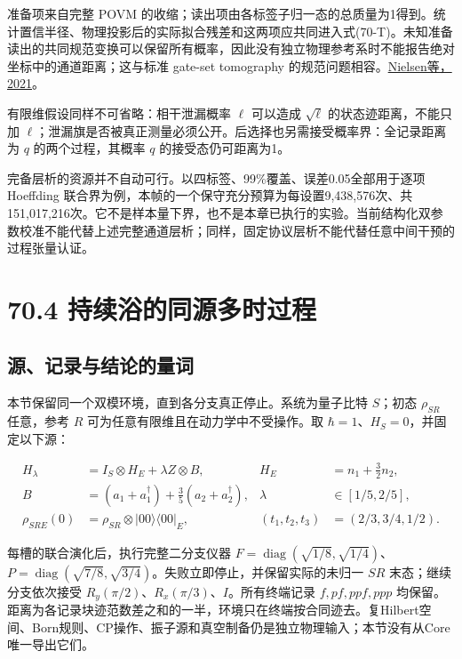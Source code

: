 \documentclass[
  11pt,
  oneside]{book}
\begin{document}
准备项来自完整 POVM
的收缩；读出项由各标签子归一态的总质量为1得到。统计置信半径、物理投影后的实际拟合残差和这两项应共同进入式(70-T)。未知准备读出的共同规范变换可以保留所有概率，因此没有独立物理参考系时不能报告绝对坐标中的通道距离；这与标准
gate-set tomography
的规范问题相容。\href{https://arxiv.org/abs/2009.07301}{Nielsen等，2021}。

有限维假设同样不可省略：相干泄漏概率 \(\ell\) 可以造成 \(\sqrt\ell\)
的状态迹距离，不能只加
\(\ell\)；泄漏旗是否被真正测量必须公开。后选择也另需接受概率界：全记录距离为
\(q\) 的两个过程，其概率 \(q\) 的接受态仍可距离为1。

完备层析的资源并不自动可行。以四标签、99\%覆盖、误差0.05全部用于逐项
Hoeffding
联合界为例，本帧的一个保守充分预算为每设置9,438,576次、共151,017,216次。它不是样本量下界，也不是本章已执行的实验。当前结构化双参数校准不能代替上述完整通道层析；同样，固定协议层析不能代替任意中间干预的过程张量认证。

\section{70.4 持续浴的同源多时过程}

\subsection{源、记录与结论的量词}

本节保留同一个双模环境，直到各分支真正停止。系统为量子比特 \(S\)；初态
\(\rho_{SR}\) 任意，参考 \(R\) 可为任意有限维且在动力学中不受操作。取
\(\hbar=1\)、\(H_S=0\)，并固定以下源：

\[
\begin{aligned}
H_\lambda&=I_S\otimes H_E+\lambda Z\otimes B,
&H_E&=n_1+\frac32n_2,\\
B&=(a_1+a_1^\dagger)+\frac35(a_2+a_2^\dagger),
&\lambda&\in[1/5,2/5],\\
\rho_{SRE}(0)&=\rho_{SR}\otimes|00\rangle\langle00|_E,
&(t_1,t_2,t_3)&=(2/3,3/4,1/2).
\end{aligned}
\]

每槽的联合演化后，执行完整二分支仪器
\(F=\operatorname{diag}(\sqrt{1/8},\sqrt{1/4})\)、\(P=\operatorname{diag}(\sqrt{7/8},\sqrt{3/4})\)。失败立即停止，并保留实际的未归一
\(SR\) 末态；继续分支依次接受
\(R_y(\pi/2)\)、\(R_x(\pi/3)\)、\(I\)。所有终端记录 \(f,pf,ppf,ppp\)
均保留。距离为各记录块迹范数差之和的一半，环境只在终端按合同迹去。复Hilbert空间、Born规则、CP操作、振子源和真空制备仍是独立物理输入；本节没有从Core唯一导出它们。
\end{document}
